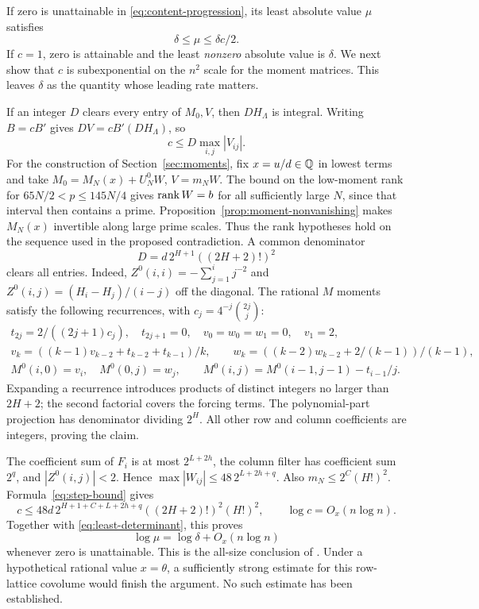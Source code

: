 If zero is unattainable in \eqref{eq:content-progression}, its least
absolute value $\mu$ satisfies
\begin{equation}\label{eq:least-determinant}
 \delta\le\mu\le\delta c/2.
\end{equation}
If $c=1$, zero is attainable and the least \emph{nonzero} absolute
value is $\delta$. We next show that $c$ is subexponential on the
$n^2$ scale for the moment matrices. This leaves $\delta$ as the
quantity whose leading rate matters.

If an integer $D$ clears every entry of $M_0,V$, then $DH_\Lambda$
is integral. Writing $B=cB'$ gives $DV=cB'(DH_\Lambda)$, so
\begin{equation}\label{eq:step-bound}
 c\le D\max_{i,j}|V_{ij}|.
\end{equation}
For the construction of Section~\ref{sec:moments}, fix $x=u/d\in\mathbb Q$
in lowest terms and take $M_0=M_N(x)+U_N^0W$, $V=m_NW$. The bound
on the low-moment rank for $65N/2<p\le145N/4$ gives $\operatorname{rank} W=b$
for all sufficiently large $N$, since that interval then contains a
prime. Proposition~\ref{prop:moment-nonvanishing} makes $M_N(x)$
invertible along large prime scales. Thus the rank hypotheses hold on
the sequence used in the proposed contradiction. A common denominator
\[
 D=d\,2^{H+1}((2H+2)!)^2
\]
clears all entries. Indeed,
$Z^0(i,i)=-\sum_{j=1}^i j^{-2}$ and
$Z^0(i,j)=(H_i-H_j)/(i-j)$ off the diagonal. The rational $M$ moments
satisfy the following recurrences, with $c_j=4^{-j}\binom{2j}j$:
\begin{gather*}
 t_{2j}=2/((2j+1)c_j),\quad t_{2j+1}=0,\quad
 v_0=w_0=w_1=0,\quad v_1=2,\\
 v_k=((k-1)v_{k-2}+t_{k-2}+t_{k-1})/k,\qquad
 w_k=((k-2)w_{k-2}+2/(k-1))/(k-1),\\
 M^0(i,0)=v_i,\quad M^0(0,j)=w_j,\qquad
 M^0(i,j)=M^0(i-1,j-1)-t_{i-1}/j.
\end{gather*}
Expanding a recurrence introduces products of distinct integers no
larger than $2H+2$; the second factorial covers the forcing terms.
The polynomial-part projection has denominator dividing $2^H$.
All other row and column coefficients are integers, proving the claim.

The coefficient sum of $F_i$ is at most $2^{L+2h}$, the column filter
has coefficient sum $2^q$, and $|Z^0(i,j)|<2$. Hence
$\max|W_{ij}|\le48\,2^{L+2h+q}$. Also
$m_N\le2^C(H!)^2$. Formula~\eqref{eq:step-bound} gives
\[
 c\le48d\,2^{H+1+C+L+2h+q}((2H+2)!)^2(H!)^2,
 \qquad \log c=O_x(n\log n).
\]
Together with \eqref{eq:least-determinant}, this proves
\begin{equation}\label{eq:content-rate}
 \log\mu=\log\delta+O_x(n\log n)
\end{equation}
whenever zero is unattainable. This is the all-size conclusion of
. Under a hypothetical rational value $x=\theta$, a sufficiently
strong estimate for this row-lattice covolume would finish the argument.
No such estimate has been established.

